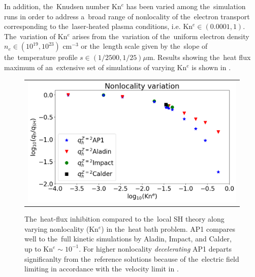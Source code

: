 In addition, the~Knudsen number Kn$^e$ has been varied among the~simulation 
runs in order to address a~broad range of nonlocality of 
the~electron transport corresponding 
to the~laser-heated plasma conditions, i.e. Kn$^e \in (0.0001, 1)$. 
The~variation of Kn$^e$ arises from the~variation
of the~uniform electron density $n_e \in (10^{19}, 10^{23})$ cm$^{-3}$ or 
the~length scale given by the~slope of the~temperature profile 
$s \in (1/2500, 1/25) \mu$m. Results showing the~heat flux maximum 
of an~extensive set of simulations of
varying Kn$^e$ is shown in .
 \begin{figure}[htb]
  \begin{center}
    \begin{tabular}{c}
      \includegraphics[width=\figscale\textwidth]{Kn_results.png}
    \end{tabular}
  \caption{  
  The~heat-flux inhibition compared to the~local SH theory along varying
  nonlocality (Kn$^e$) in the~heat bath problem. AP1 compares well to 
  the~full kinetic simulations by Aladin, Impact, and Calder, up to 
  Kn$^e \sim 10^{-1}$. For higher nonlocality \textit{decelerating} 
  AP1 departs significanlty from the~reference solutions because of
  the~electric field limiting in accordance with the~velocity limit in 
  . 
  }
  \label{fig:Kn_results}
  \end{center} 
\end{figure}
